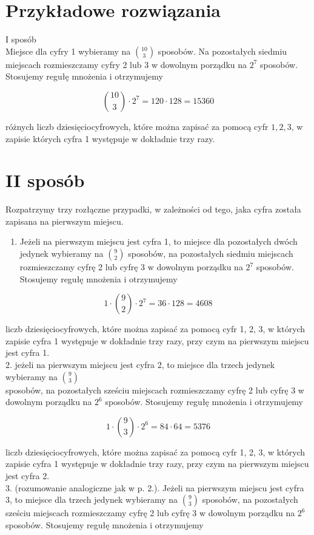 \documentclass[10pt]{article}
\begin{document}
\section*{Przykładowe rozwiązania}
I sposób\\
Miejsce dla cyfry 1 wybieramy na $\binom{10}{3}$ sposobów. Na pozostałych siedmiu miejscach rozmieszczamy cyfry 2 lub 3 w dowolnym porządku na $2^{7}$ sposobów. Stosujemy regułę mnożenia i otrzymujemy

$$
\binom{10}{3} \cdot 2^{7}=120 \cdot 128=15360
$$

różnych liczb dziesięciocyfrowych, które można zapisać za pomocą cyfr $1,2,3$, w zapisie których cyfra 1 występuje w dokładnie trzy razy.

\section*{II sposób}
Rozpatrzymy trzy rozłączne przypadki, w zależności od tego, jaka cyfra została zapisana na pierwszym miejscu.

\begin{enumerate}
  \item Jeżeli na pierwszym miejscu jest cyfra 1, to miejsce dla pozostałych dwóch jedynek wybieramy na $\binom{9}{2}$ sposobów, na pozostałych siedmiu miejscach rozmieszczamy cyfrę 2 lub cyfrę 3 w dowolnym porządku na $2^{7}$ sposobów. Stosujemy regułę mnożenia i otrzymujemy
\end{enumerate}

$$
1 \cdot\binom{9}{2} \cdot 2^{7}=36 \cdot 128=4608
$$

liczb dziesięciocyfrowych, które można zapisać za pomocą cyfr 1, 2, 3, w których zapisie cyfra 1 występuje w dokładnie trzy razy, przy czym na pierwszym miejscu jest cyfra 1.\\
2. jeżeli na pierwszym miejscu jest cyfra 2, to miejsce dla trzech jedynek wybieramy na $\binom{9}{3}$\\
sposobów, na pozostałych sześciu miejscach rozmieszczamy cyfrę 2 lub cyfrę 3 w dowolnym porządku na $2^{6}$ sposobów. Stosujemy regułę mnożenia i otrzymujemy

$$
1 \cdot\binom{9}{3} \cdot 2^{6}=84 \cdot 64=5376
$$

liczb dziesięciocyfrowych, które można zapisać za pomocą cyfr 1, 2, 3, w których zapisie cyfra 1 występuje w dokładnie trzy razy, przy czym na pierwszym miejscu jest cyfra 2.\\
3. (rozumowanie analogiczne jak w p. 2.). Jeżeli na pierwszym miejscu jest cyfra 3, to miejsce dla trzech jedynek wybieramy na $\binom{9}{3}$ sposobów, na pozostałych sześciu miejscach rozmieszczamy cyfrę 2 lub cyfrę 3 w dowolnym porządku na $2^{6}$ sposobów. Stosujemy regułę mnożenia i otrzymujemy
\end{document}
